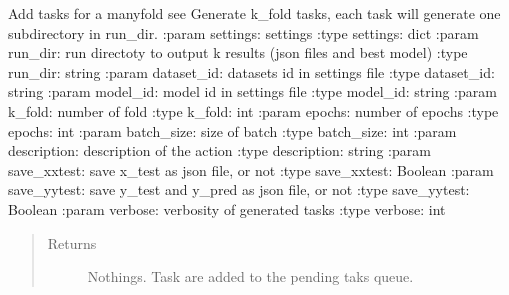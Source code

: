 \documentclass[letterpaper,10pt,english]{sphinxmanual}
\begin{document}

\begin{fulllineitems}
\label{\detokenize{pyterk:pyterk.task_manager.add_manyfold}}
\sphinxAtStartPar
Add tasks for a manyfold \sphinxhyphen{} see 
Generate k\_fold tasks, each task will generate one subdirectory in run\_dir.
:param settings: settings
:type settings: dict
:param run\_dir: run directoty to output k results (json files and best model)
:type run\_dir: string
:param dataset\_id: datasets id in settings file
:type dataset\_id: string
:param model\_id: model id in settings file
:type model\_id: string
:param k\_fold: number of fold
:type k\_fold: int
:param epochs: number of epochs
:type epochs: int
:param batch\_size: size of batch
:type batch\_size: int
:param description: description of the action
:type description: string
:param save\_xxtest: save x\_test as json file, or not
:type save\_xxtest: Boolean
:param save\_yytest: save y\_test and y\_pred  as json file, or not
:type save\_yytest: Boolean
:param verbose: verbosity of generated tasks
:type verbose: int
\begin{quote}\begin{description}
\item[{Returns}] \leavevmode
\sphinxAtStartPar
Nothings. Task are added to the pending taks queue.

\end{description}\end{quote}

\end{fulllineitems}
\end{document}

